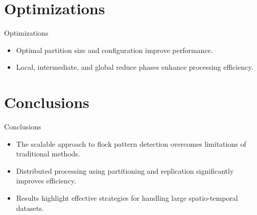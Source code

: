 \documentclass{beamer}
\begin{document}
\section{Optimizations}
\begin{frame}{Optimizations}
    \begin{itemize}
        \item Optimal partition size and configuration improve performance.
        \item Local, intermediate, and global reduce phases enhance processing efficiency.
    \end{itemize}
\end{frame}

\section{Conclusions}
\begin{frame}{Conclusions}
    \begin{itemize}
        \item The scalable approach to flock pattern detection overcomes limitations of traditional methods.
        \item Distributed processing using partitioning and replication significantly improves efficiency.
        \item Results highlight effective strategies for handling large spatio-temporal datasets.
    \end{itemize}
\end{frame}
\end{document}
